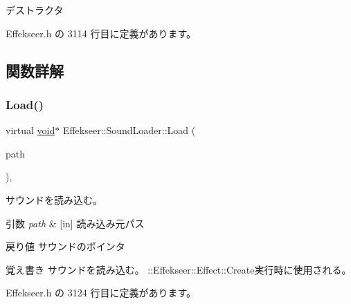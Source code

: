 デストラクタ 



 Effekseer.\+h の 3114 行目に定義があります。



\subsection{関数詳解}
\mbox{\label{class_effekseer_1_1_sound_loader_a871ad4843c0dee971d897a654643bdef}} 
\subsubsection{\texorpdfstring{Load()}{Load()}}
{\footnotesize\ttfamily virtual \mbox{\hyperlink{namespace_effekseer_ab34c4088e512200cf4c2716f168deb56}{void}}$\ast$ Effekseer\+::\+Sound\+Loader\+::\+Load (\begin{DoxyParamCaption}\item[{const \mbox{\hyperlink{_effekseer_8h_a50b026abea014b47854bcd835b3b6233}{E\+F\+K\+\_\+\+C\+H\+AR}} $\ast$}]{path }\end{DoxyParamCaption})\hspace{0.3cm}{\ttfamily [inline]}, {\ttfamily [virtual]}}



サウンドを読み込む。 


\begin{DoxyParams}{引数}
{\em path} & \mbox{[}in\mbox{]} 読み込み元パス \\
\hline
\end{DoxyParams}
\begin{DoxyReturn}{戻り値}
サウンドのポインタ 
\end{DoxyReturn}
\begin{DoxyNote}{覚え書き}
サウンドを読み込む。 \+::\+Effekseer\+::\+Effect\+::\+Create実行時に使用される。 
\end{DoxyNote}


 Effekseer.\+h の 3124 行目に定義があります。

\mbox{\label{class_effekseer_1_1_sound_loader_aa0b0fda4cbd0f9a6b9bf1babaef93679}} 
